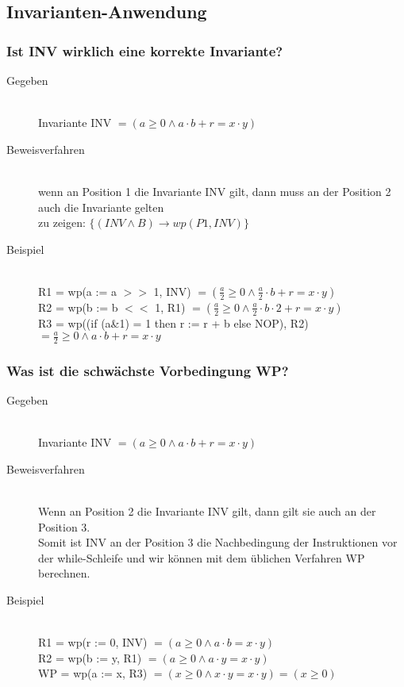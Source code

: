 \documentclass[a4paper,10pt]{article}
\newcommand{\ra}{\rightarrow}
\begin{document}
\subsection{Invarianten-Anwendung}

\subsubsection{Ist INV wirklich eine korrekte Invariante?}
\begin{description}
	\item[Gegeben] \hfill \\
		Invariante INV $= (a \geq 0 \wedge a\cdot b + r = x\cdot y)$ 
	\item[Beweisverfahren] \hfill \\
		wenn an Position 1 die Invariante INV gilt, dann muss an der Position 2 auch die Invariante gelten \\
		zu zeigen: $\{ (INV \wedge B) \ra wp(P1, INV) \}$
	\item[Beispiel] \hfill \\
		R1 = wp(a := a $>>$ 1, INV) $= (\frac{a}{2} \geq 0 \wedge \frac{a}{2}\cdot b + r = x\cdot y)$ \\
		R2 = wp(b := b $<<$ 1, R1) $= (\frac{a}{2} \geq 0 \wedge \frac{a}{2}\cdot b\cdot 2 + r = x\cdot y)$ \\
		R3 = wp((if (a\&1) = 1 then r := r + b else NOP), R2) $= \frac{a}{2} \geq 0 \wedge a\cdot b + r = x\cdot y$
\end{description}

\subsubsection{Was ist die schw\"achste Vorbedingung WP?}
\begin{description}
	\item[Gegeben] \hfill \\
		Invariante INV $= (a \geq 0 \wedge a\cdot b + r = x\cdot y)$ 
	\item[Beweisverfahren] \hfill \\
		Wenn an Position 2 die Invariante INV gilt, dann gilt sie auch an der Position 3. \\
		Somit ist INV an der Position 3 die Nachbedingung der Instruktionen vor der while-Schleife und wir k\"onnen mit dem \"ublichen Verfahren WP berechnen.
	\item[Beispiel] \hfill \\
		R1 = wp(r := 0, INV) $= (a \geq 0 \wedge a\cdot b = x\cdot y)$ \\
		R2 = wp(b := y, R1) $= (a \geq 0 \wedge a\cdot y = x\cdot y)$ \\
		WP = wp(a := x, R3) $= (x \geq 0 \wedge x\cdot y = x\cdot y) = (x \geq 0)$
\end{description}
\end{document}
